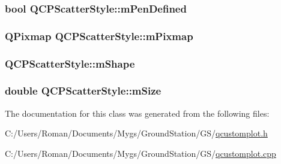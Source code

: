 \subsubsection[{m\+Pen\+Defined}]{\setlength{\rightskip}{0pt plus 5cm}bool Q\+C\+P\+Scatter\+Style\+::m\+Pen\+Defined\hspace{0.3cm}{\ttfamily [protected]}}\label{class_q_c_p_scatter_style_a84ef5aa591ddba07b440f597e1669e78}
\hypertarget{class_q_c_p_scatter_style_a7697346c89b19d4cd1d8dd33319ec9e3}{}
\subsubsection[{m\+Pixmap}]{\setlength{\rightskip}{0pt plus 5cm}Q\+Pixmap Q\+C\+P\+Scatter\+Style\+::m\+Pixmap\hspace{0.3cm}{\ttfamily [protected]}}\label{class_q_c_p_scatter_style_a7697346c89b19d4cd1d8dd33319ec9e3}
\hypertarget{class_q_c_p_scatter_style_af1b327f35f107ed108290187bbc8c7c6}{}
\subsubsection[{m\+Shape}]{ Q\+C\+P\+Scatter\+Style\+::m\+Shape\hspace{0.3cm}{\ttfamily [protected]}}\label{class_q_c_p_scatter_style_af1b327f35f107ed108290187bbc8c7c6}
\hypertarget{class_q_c_p_scatter_style_a757da98671eb06b221979373ac2cec91}{}
\subsubsection[{m\+Size}]{\setlength{\rightskip}{0pt plus 5cm}double Q\+C\+P\+Scatter\+Style\+::m\+Size\hspace{0.3cm}{\ttfamily [protected]}}\label{class_q_c_p_scatter_style_a757da98671eb06b221979373ac2cec91}


The documentation for this class was generated from the following files\+:\begin{DoxyCompactItemize}
\item 
C\+:/\+Users/\+Roman/\+Documents/\+Mygs/\+Ground\+Station/\+G\+S/\hyperlink{qcustomplot_8h}{qcustomplot.\+h}\item 
C\+:/\+Users/\+Roman/\+Documents/\+Mygs/\+Ground\+Station/\+G\+S/\hyperlink{qcustomplot_8cpp}{qcustomplot.\+cpp}\end{DoxyCompactItemize}
